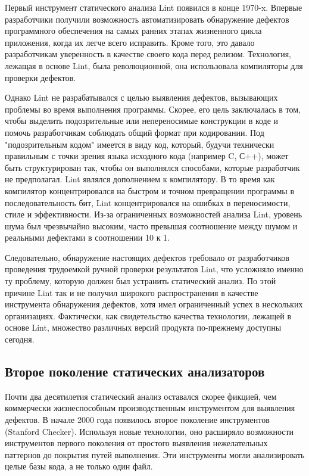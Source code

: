 Первый инструмент статического анализа Lint появился в конце 1970-x. Впервые разработчики 
получили возможность автоматизировать обнаружение дефектов программного обеспечения на самых 
ранних этапах жизненного цикла приложения, когда их легче всего исправить. Кроме того, это 
давало разработчикам уверенность в качестве своего кода перед релизом. Технология, лежащая в 
основе Lint, была революционной, она использовала компиляторы для проверки дефектов. 

Однако Lint не разрабатывался с целью выявления дефектов, вызывающих проблемы во 
время выполнения программы. Скорее, его цель заключалась в том, чтобы выделить подозрительные 
или непереносимые конструкции в коде и помочь разработчикам соблюдать общий формат при 
кодировании. Под "подозрительным кодом" имеется в виду код, который, будучи технически правильным 
с точки зрения языка исходного кода (например C, С++), может быть структурирован так, чтобы он 
выполнялся способами, которые разработчик не предполагал. Lint являлся дополнением к компилятору. В то время как  компилятор концентрировался на быстром и точном превращении программы в последовательность бит, Lint концентрировался на ошибках в переносимости, стиле и эффективности.
Из-за ограниченных возможностей анализа Lint, уровень шума был чрезвычайно высоким, часто превышая соотношение между шумом и реальными дефектами в соотношении 10 к 1.

Следовательно, обнаружение настоящих дефектов требовало от разработчиков проведения трудоемкой 
ручной проверки результатов Lint, что усложняло именно ту проблему, которую должен был 
устранить статический анализ. По этой причине Lint так и не получил широкого распространения в 
качестве инструмента обнаружения дефектов, хотя имел ограниченный успех в нескольких 
организациях. Фактически, как свидетельство качества технологии, лежащей в основе Lint, 
множество различных версий продукта по-прежнему доступны сегодня. %

\subsection{Второе поколение статических анализаторов}
Почти два десятилетия статический анализ оставался скорее фикцией, чем коммерчески 
жизнеспособным производственным инструментом для выявления дефектов. В начале 2000 года
появилось второе поколение инструментов (Stanford Checker). Используя новые 
технологии, оно расширяло возможности инструментов первого поколения от простого выявления 
нежелательных паттернов до покрытия путей выполнения. Эти инструменты могли анализировать 
целые базы кода, а не только один файл. 

